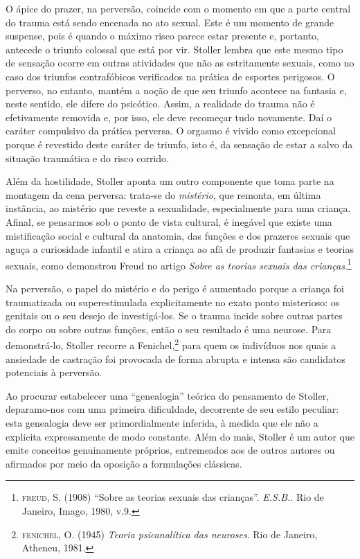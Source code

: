 O ápice do prazer, na perversão, coincide com o momento em que a parte
central do trauma está sendo encenada no ato sexual. Este é um momento de
grande suspense, pois é quando o máximo risco parece estar presente e,
portanto, antecede o triunfo colossal que está por vir. Stoller lembra que
este mesmo tipo de sensação ocorre em outras atividades que não as
estritamente sexuais, como no caso dos triunfos contrafóbicos verificados
na prática de esportes perigosos. O perverso, no entanto, mantém a noção de
que seu triunfo acontece na fantasia e, neste sentido, ele difere do
psicótico. Assim, a realidade do trauma não é efetivamente removida e, por
isso, ele deve recomeçar tudo novamente. Daí o caráter compulsivo da
prática perversa. O orgasmo é vivido como excepcional porque é revestido
deste caráter de triunfo, isto é, da sensação de estar a salvo da situação
traumática e do risco corrido.

Além da hostilidade, Stoller aponta um outro componente que toma parte na
montagem da cena perversa: trata-se do \textit{mistério}, que remonta, em
última instância, ao mistério que reveste a sexualidade, especialmente para
uma criança. Afinal, se pensarmos sob o ponto de vista cultural, é inegável
que existe uma mistificação social e cultural da anatomia, das funções e
dos prazeres sexuais que aguça a curiosidade infantil e atira a criança ao
afã de produzir fantasias e teorias sexuais, como demonstrou Freud no
artigo \textit{Sobre as teorias sexuais das crianças}.\footnote{ \textsc{freud}, S.
(1908) “Sobre as teorias sexuais das crianças”. \textit{E.S.B.}. Rio de
Janeiro, Imago, 1980, v.9.}

Na perversão, o papel do mistério e do perigo é aumentado porque a criança
foi traumatizada ou superestimulada explicitamente no exato ponto
misterioso: os genitais ou o seu desejo de investigá-los. Se o trauma
incide sobre outras partes do corpo ou sobre outras funções, então o seu
resultado é uma neurose. Para demonstrá-lo, Stoller recorre a
Fenichel,\footnote{ \textsc{fenichel}, O. (1945) \textit{Teoria psicanalítica das
neuroses}. Rio de Janeiro, Atheneu, 1981.} para quem os indivíduos nos
quais a ansiedade de castração foi provocada de forma abrupta e intensa são
candidatos potenciais à perversão.

\asterisc

Ao procurar estabelecer uma “genealogia” teórica do pensamento de Stoller,
deparamo-nos com uma primeira dificuldade, decorrente de seu estilo
peculiar: esta genealogia deve ser primordialmente inferida, à medida que
ele não a explicita expressamente de modo constante. Além do mais, Stoller
é um autor que emite conceitos genuinamente próprios, entremeados aos de
outros autores ou afirmados por meio da oposição a formulações clássicas.


